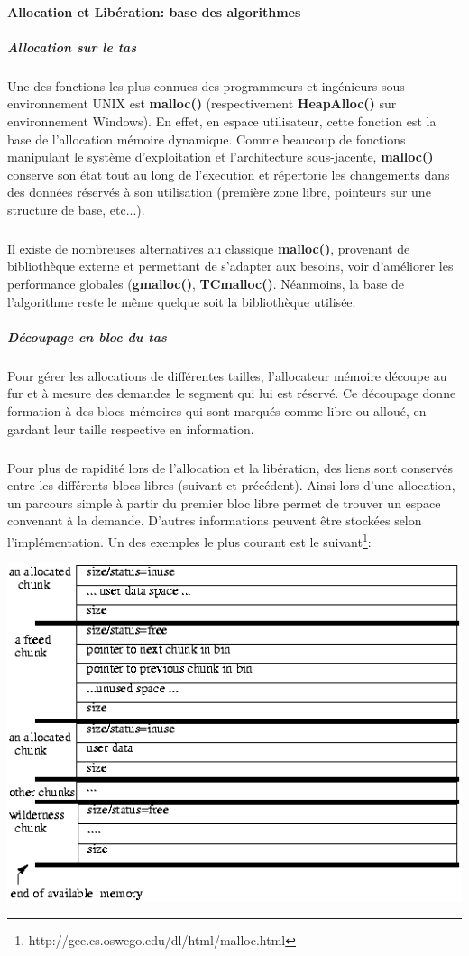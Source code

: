 \paragraph{Allocation et Libération: base des algorithmes}
\subparagraph{Allocation sur le tas}
Une des fonctions les plus connues des programmeurs et ingénieurs sous environnement UNIX est \textbf{malloc()} (respectivement \textbf{HeapAlloc()} sur
environnement Windows). En effet, en espace utilisateur, cette fonction est la base de l'allocation mémoire dynamique. Comme beaucoup de fonctions
manipulant le système d'exploitation et l'architecture sous-jacente, \textbf{malloc()} conserve son état tout au long de l'execution et répertorie les
changements dans des données réservés à son utilisation (première zone libre, pointeurs sur une structure de base, etc...).
\subparagraph{}
Il existe de nombreuses alternatives au classique \textbf{malloc()}, provenant de bibliothèque externe et permettant de s'adapter aux besoins, voir d'améliorer les
performance globales (\textbf{gmalloc()}, \textbf{TCmalloc()}. Néanmoins, la base de l'algorithme reste le même quelque soit la bibliothèque utilisée.

\subparagraph{Découpage en bloc du tas}
Pour gérer les allocations de différentes tailles, l'allocateur mémoire découpe au fur et à mesure des demandes
le segment qui lui est réservé. Ce découpage donne formation à des blocs mémoires qui sont marqués comme libre ou alloué, en gardant leur taille respective
en information.
\subparagraph{}
Pour plus de rapidité lors de l'allocation et la libération, des liens sont conservés entre les différents blocs libres (suivant et précédent). Ainsi lors d'une allocation,
un parcours simple à partir du premier bloc libre permet de trouver un espace convenant à la demande. D'autres informations peuvent être stockées selon l'implémentation.
Un des exemples le plus courant est le suivant\footnote{http://gee.cs.oswego.edu/dl/html/malloc.html}:
\begin{center}
\includegraphics[scale=0.5]{malloc.png}\newline
\end{center}

